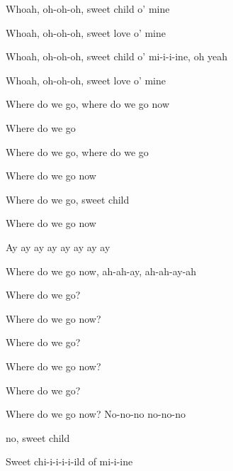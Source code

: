 \begin{song}
\bigskip

Whoah, oh-oh-oh, sweet child o' mine \par
{}Whoah, oh-oh-oh, sweet love o' mine \par
{}Whoah, oh-oh-oh, sweet child o' mi-i-i-ine, oh yeah \par
{}Whoah, oh-oh-oh, sweet love o' mine \par

\bigskip

 \par
{}     \par
{}      \par

\bigskip

Where do we go, where do we go now \par
{}Where do we go    \par
{}Where do we go, where do we go \par
{}Where do we go now   \par
{}Where do we go,  sweet child \par
{}Where do we go now   \par
{}Ay ay ay ay ay ay ay ay \par
{}Where do we go now, ah-ah-ay, ah-ah-ay-ah \par

\bigskip

Where do we go?  \par
{}Where do we go now?   \par
{}Where do we go?  \par
{}Where do we go now?   \par

Where do we go?  \par
{}Where do we go now? No-no-no no-no-no \par
{}no, sweet child \par
Sweet chi-i-i-i-i-ild of mi-i-ine \par

\end{song}
